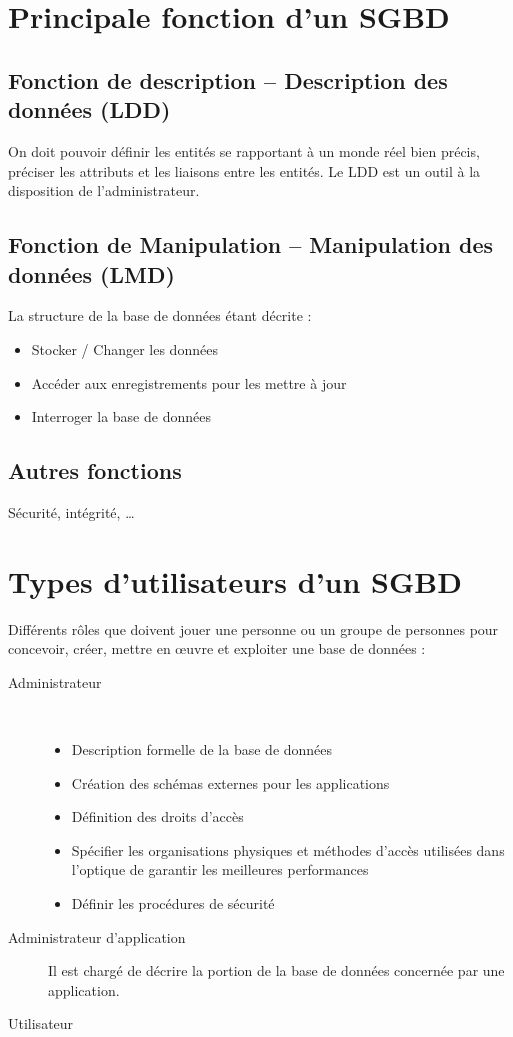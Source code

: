 \documentclass[12pt,a4paper,openany]{book}
\newcommand{\bd}{base de données}
\begin{document}
	\section{Principale fonction d'un SGBD}
	\subsection{Fonction de description -- Description des données (LDD)}
	On doit pouvoir définir les entités se rapportant à un monde réel bien précis, préciser les attributs et les liaisons entre les entités. Le LDD
	est un outil à la disposition de l'administrateur.

	\subsection{Fonction de Manipulation -- Manipulation des données (LMD)}
	La structure de la \bd{} étant décrite : 
	\begin{itemize}
		\item Stocker / Changer les données
		\item Accéder aux enregistrements pour les mettre à jour
		\item Interroger la \bd{}
	\end{itemize}

	\subsection{Autres fonctions}
	Sécurité, intégrité, \ldots

	\section{Types d'utilisateurs d'un SGBD}
	Différents rôles que doivent jouer une personne ou un groupe de personnes pour concevoir, créer, mettre en œuvre et exploiter une \bd{} :
	\begin{description}
		\item[Administrateur]~
			\begin{itemize}
				\item Description formelle de la \bd
				\item Création des schémas externes pour les applications
				\item Définition des droits d'accès
				\item Spécifier les organisations physiques et méthodes d'accès utilisées dans l'optique de garantir les meilleures performances
				\item Définir les procédures de sécurité
			\end{itemize}
		\item[Administrateur d'application] Il est chargé de décrire la portion de la base de données concernée par une application. 
		\item[Utilisateur] 
	\end{description}
\end{document}
